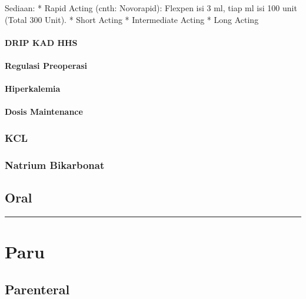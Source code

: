 \documentclass[
]{book}
\begin{document}
Sediaan:
* Rapid Acting (cnth: Novorapid): Flexpen isi 3 ml, tiap ml isi 100 unit (Total 300 Unit).
* Short Acting
* Intermediate Acting
* Long Acting

\hypertarget{drip-kad-hhs}{%
\paragraph{DRIP KAD HHS}\label{drip-kad-hhs}}

\hypertarget{regulasi-preoperasi}{%
\paragraph{Regulasi Preoperasi}\label{regulasi-preoperasi}}

\hypertarget{hiperkalemia-1}{%
\paragraph{Hiperkalemia}\label{hiperkalemia-1}}

\hypertarget{dosis-maintenance}{%
\paragraph{Dosis Maintenance}\label{dosis-maintenance}}

\hypertarget{kcl}{%
\subsubsection{KCL}\label{kcl}}

\hypertarget{natrium-bikarbonat}{%
\subsubsection{Natrium Bikarbonat}\label{natrium-bikarbonat}}

\hypertarget{oral}{%
\subsection{Oral}\label{oral}}

\begin{center}\rule{0.5\linewidth}{0.5pt}\end{center}

\hypertarget{paru-1}{%
\section{Paru}\label{paru-1}}

\hypertarget{parenteral-1}{%
\subsection{Parenteral}\label{parenteral-1}}
\end{document}
